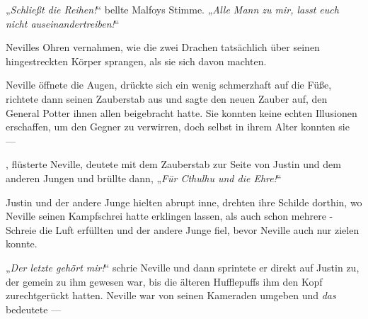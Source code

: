 „\emph{Schließt die Reihen!}“ bellte Malfoys Stimme.
„\emph{Alle Mann zu mir, lasst euch nicht auseinandertreiben!}“

Nevilles Ohren vernahmen, wie die zwei Drachen tatsächlich über seinen hingestreckten Körper sprangen, als sie sich davon machten.

Neville öffnete die Augen, drückte sich ein wenig schmerzhaft auf die Füße, richtete dann seinen Zauberstab aus und sagte den neuen Zauber auf, den General Potter ihnen allen beigebracht hatte. Sie konnten keine echten Illusionen erschaffen, um den Gegner zu verwirren, doch selbst in ihrem Alter konnten sie —

,%
flüsterte Neville, deutete mit dem Zauberstab zur Seite von Justin und dem anderen Jungen und brüllte dann,
„\emph{Für Cthulhu und die Ehre!}“

Justin und der andere Junge hielten abrupt inne, drehten ihre Schilde dorthin, wo Neville seinen Kampfschrei hatte erklingen lassen, als auch schon mehrere -Schreie die Luft erfüllten und der andere Junge fiel, bevor Neville auch nur zielen konnte.

„\emph{Der letzte gehört mir!}“ schrie Neville und dann sprintete er direkt auf Justin zu, der gemein zu ihm gewesen war, bis die älteren Hufflepuffs ihm den Kopf zurechtgerückt hatten. Neville war von seinen Kameraden umgeben und \emph{das} bedeutete —

